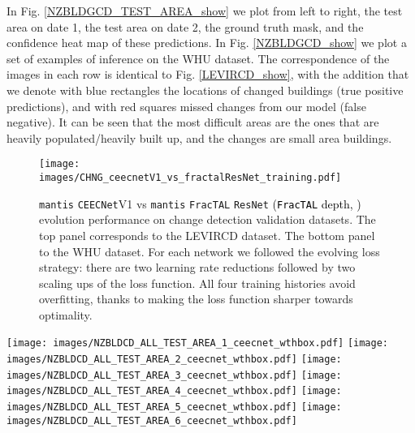 \documentclass[times, 5p]{elsarticle}
\def \FracTAL {\texttt{FracTAL} }
\newcommand{\ceecnet}{\texttt{CEECNet}}
\newcommand{\mantis}{\texttt{mantis}}
\begin{document}
In Fig. \ref{NZBLDGCD_TEST_AREA_show} we plot from left to right, the test area on date 1, the test area on date 2, the ground truth mask, and the confidence heat map of these predictions. 
In Fig. \ref{NZBLDGCD_show} we plot a set of examples of inference on the WHU dataset. The correspondence of the images in each row is identical to Fig. \ref{LEVIRCD_show}, with the addition that we denote with blue rectangles the locations of changed buildings (true positive predictions), and with red squares missed changes from our model (false negative). It can be seen that  the most difficult areas are the ones that are heavily populated/heavily built up, and the changes are small area buildings. 



\begin{figure}
\centering
\texttt{[image: images/CHNG\_ceecnetV1\_vs\_fractalResNet\_training.pdf]}
\caption{\mantis{} \ceecnet{}V1 vs \mantis{} \FracTAL \texttt{ResNet}  \textcolor{black}{(\FracTAL depth, )} evolution performance on change detection validation datasets. The top panel corresponds to the LEVIRCD dataset. The bottom panel to the WHU dataset. For each network  we followed the evolving loss strategy: there are two learning rate reductions followed by two scaling ups of the  loss function. All four training histories avoid overfitting, thanks to making the loss function sharper towards optimality. } 
\label{ceecnet_vs_fractal_resunet}
\end{figure}


\begin{figure*}
\centering
\texttt{[image: images/NZBLDCD\_ALL\_TEST\_AREA\_1\_ceecnet\_wthbox.pdf]}
\texttt{[image: images/NZBLDCD\_ALL\_TEST\_AREA\_2\_ceecnet\_wthbox.pdf]}
\texttt{[image: images/NZBLDCD\_ALL\_TEST\_AREA\_3\_ceecnet\_wthbox.pdf]}
\texttt{[image: images/NZBLDCD\_ALL\_TEST\_AREA\_4\_ceecnet\_wthbox.pdf]}
\texttt{[image: images/NZBLDCD\_ALL\_TEST\_AREA\_5\_ceecnet\_wthbox.pdf]}
\texttt{[image: images/NZBLDCD\_ALL\_TEST\_AREA\_6\_ceecnet\_wthbox.pdf]}
\caption{Sample of change detection on windows of size  from the WHU dataset. Inference is with the \mantis{} \ceecnet V1  model. The ordering of the inputs, for each row, is as in Fig. \ref{LEVIRCD_show}. We indicate with blue boxes successful findings and with red boxes missed changes on buildings.} 
\label{NZBLDGCD_show}
\end{figure*}
\end{document}
